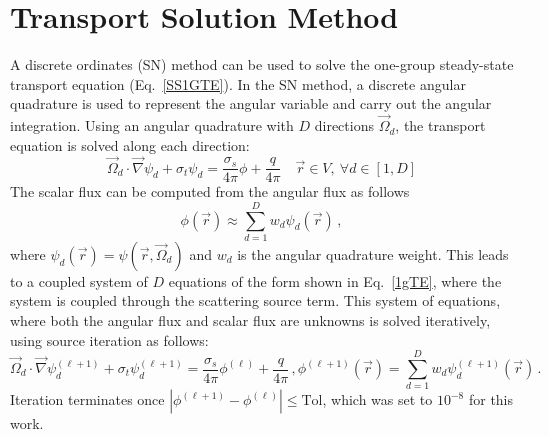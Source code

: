 \documentclass[12pt]{report}
\newcommand{\vr}{\vec{r}}
\newcommand{\vO}{\vec{\Omega}}
\newcommand{\grad}{\vec{\nabla}}
\newcommand{\sigt}{\sigma_t}
\newcommand{\sigs}{\sigma_s}
\newcommand{\angSource}{\frac{q}{4 \pi}}
\begin{document}
\section{Transport Solution Method}
A discrete ordinates (SN) method can be used to solve the one-group steady-state transport 
equation (Eq.~\eqref{SS1GTE}). In the SN method, a discrete angular quadrature is used to represent
the angular variable and carry out the angular integration.
Using an angular quadrature with $D$ directions $\vO_d$, the transport 
equation is solved along each direction:
\begin{equation}
\label{1gSNTE}
\vO_d \cdot \grad \psi_d + \sigt \psi_d = \frac{\sigs}{4 \pi} \phi + \angSource \quad \vr \in V ,\  \forall d\in [1,D]
\end{equation}
%
The scalar flux can be computed from the angular flux as follows
\[
\phi(\vr) \approx \sum_{d=1}^D w_d \psi_d(\vr) \,,
\] 
where $\psi_d(\vr) = \psi(\vr, \vO_d)$ and $w_d$ is the angular quadrature weight. This leads to a coupled system of $D$ equations of the form shown in Eq.~\eqref{1gTE}, where the system is coupled through the scattering source term. This system of equations, where both 
the angular flux and scalar flux are unknowns is solved iteratively, using source iteration as follows:
\begin{subequations}
\begin{equation}
\label{1gTE}
\vO_d \cdot \grad \psi_d^{(\ell+1)} + \sigt \psi_d^{(\ell+1)} = \frac{\sigs}{4 \pi} \phi^{(\ell)} + \angSource \,,
\end{equation}
\begin{equation}
\phi^{(\ell+1)}(\vr) = \sum_{d=1}^D w_d \psi_d^{(\ell+1)}(\vr) \,.
\end{equation}
\end{subequations}
Iteration terminates once $\left|\phi^{(\ell+1)} - \phi^{(\ell)} \right| \leq \text{Tol}$, which was set to $10^{-8}$ for this work.
\end{document}
